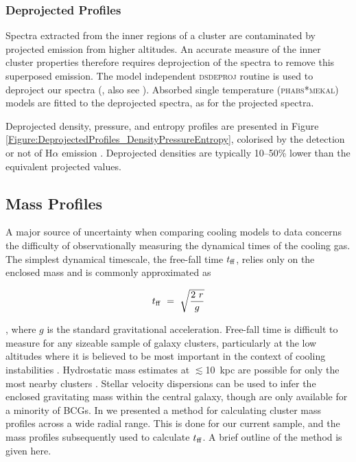 \documentclass[twocolumn]{aastex6}
\newcommand{\tff}{$t_{\rm ff}$}
\begin{document}
\subsubsection{Deprojected Profiles} \label{Section:Deprojected_and_Density_Stuff}

Spectra extracted from the inner regions of a cluster are contaminated by projected emission from higher altitudes.  An accurate measure of the inner cluster properties therefore requires deprojection of the spectra to remove this superposed emission.  The model independent \textsc{dsdeproj} routine is used to deproject our spectra (\citealt[][]{Russell08}, also see \citealt[][]{Sanders07,Sanders08}). Absorbed single temperature  (\textsc{phabs}*\textsc{mekal}) models are fitted to the deprojected spectra, as for the projected spectra.  

Deprojected density, pressure, and entropy profiles are presented in Figure \ref{Figure:DeprojectedProfiles_DensityPressureEntropy}, colorised by the detection or not of H$\alpha$ emission \cite[][]{Crawford99,Cavagnolo09,Rawle12}.  Deprojected densities are typically 10--50\% lower than the equivalent projected values.


\subsection{Mass Profiles}  \label{Section:Mass_Fitting}
A major source of uncertainty when comparing cooling models to data concerns the difficulty of observationally measuring the dynamical times of the cooling gas.  The simplest dynamical timescale, the free-fall time \tff, relies only on the enclosed mass and is commonly approximated as 

\begin{equation} \label{Equation:tff}
t_{\rm ff}~=~\sqrt\frac{2~r}{g}
\end{equation}

\noindent \cite[e.g.][]{Gaspari12,McDonald15}, where $g$ is the standard gravitational acceleration.  Free-fall time is difficult to measure for any sizeable sample of galaxy clusters, particularly at the low altitudes where it is believed to be most important in the context of cooling instabilities \cite[e.g.][]{McCourt12,Sharma12b}. Hydrostatic mass estimates at $\lesssim$10~kpc are possible for only the most nearby clusters \cite[e.g. M87, see][]{Romanowsky01,Russell15}.  Stellar velocity dispersions can be used to infer the enclosed gravitating mass within the central galaxy, though are only available for a minority of BCGs.  In \citet[][]{Hogan17} we presented a method for calculating cluster mass profiles across a wide radial range. This is done for our current sample, and the mass profiles subsequently used to calculate \tff. A brief outline of the method is given here.
\end{document}
